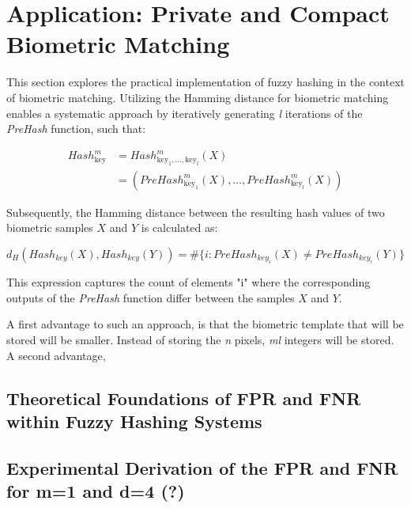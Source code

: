 \newpage
\section{Application: Private and Compact Biometric Matching}
\label{Application: Private and Compact Biometric Matching}

This section explores the practical implementation of fuzzy hashing in the context of biometric matching. Utilizing the Hamming distance for biometric matching enables a systematic approach by iteratively generating \textit{l} iterations of the \textit{PreHash} function, such that:

\begin{equation}
    \begin{aligned}
        Hash_{\text{key}}^m &= Hash_{\text{key}_1, \ldots, \text{key}_l}^m(X)\\
        &= (PreHash_{\text{key}_1}^m(X), \ldots, PreHash_{\text{key}_l}^m(X))
    \end{aligned}
\end{equation}


Subsequently, the Hamming distance between the resulting hash values of two biometric samples \(X\) and \(Y\) is calculated as:

\[d_H(Hash_{key}(X), Hash_{key}(Y)) = \# \{i: PreHash_{key_i}(X) \neq PreHash_{key_i}(Y)\}\]

This expression captures the count of elements "i" where the corresponding outputs of the \textit{PreHash} function differ between the samples \(X\) and \(Y\). 

A first advantage to such an approach, is that the biometric template that will be stored will be smaller. Instead of storing the \textit{n} pixels, \textit{ml} integers will be stored. A second advantage, 


\subsection{Theoretical Foundations of FPR and FNR within Fuzzy Hashing Systems}

\subsection{Experimental Derivation of the FPR and FNR for m=1 and d=4 (?)}
